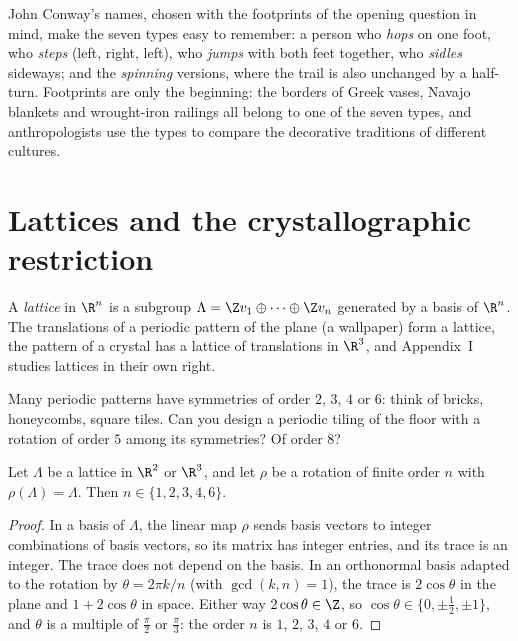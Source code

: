 John Conway's names, chosen with the footprints of the opening question in mind, make the seven types easy to remember: a person who
\emph{hops} on one foot, who \emph{steps} (left, right, left), who \emph{jumps} with both feet together, who \emph{sidles} sideways; and
the \emph{spinning} versions, where the trail is also unchanged by a half-turn. Footprints are only the beginning: the borders of Greek
vases, Navajo blankets and wrought-iron railings all belong to one of the seven types, and anthropologists use the types to compare
the decorative traditions of different cultures.

\section{Lattices and the crystallographic restriction}

A \emph{lattice} in $\R^n$ is a subgroup $\Lambda=\Z v_1\oplus\dots\oplus\Z v_n$ generated by a basis of $\R^n$. The translations of a
periodic pattern of the plane (a wallpaper) form a lattice, the pattern of a crystal has a lattice of translations in $\R^3$, and
Appendix~I studies lattices in their own right.

\begin{think}
Many periodic patterns have symmetries of order $2$, $3$, $4$ or $6$: think of bricks, honeycombs, square tiles. Can you design a
periodic tiling of the floor with a rotation of order $5$ among its symmetries? Of order $8$?
\end{think}

\begin{theorem}\label{geometry:thm:crystallographic}
Let $\Lambda$ be a lattice in $\R^2$ or $\R^3$, and let $\rho$ be a rotation of finite order $n$ with $\rho(\Lambda)=\Lambda$. Then
$n\in\{1,2,3,4,6\}$.
\end{theorem}
\begin{proof}
In a basis of $\Lambda$, the linear map $\rho$ sends basis vectors to integer combinations of basis vectors, so its matrix has integer
entries, and its trace is an integer. The trace does not depend on the basis. In an orthonormal basis adapted to the rotation by
$\theta=2\pi k/n$ (with $\gcd(k,n)=1$), the trace is $2\cos\theta$ in the plane and $1+2\cos\theta$ in space. Either way
$2\cos\theta\in\Z$, so $\cos\theta\in\{0,\pm\frac12,\pm1\}$, and $\theta$ is a multiple of $\frac\pi2$ or $\frac\pi3$: the order $n$ is $1$,
$2$, $3$, $4$ or $6$.
\end{proof}

